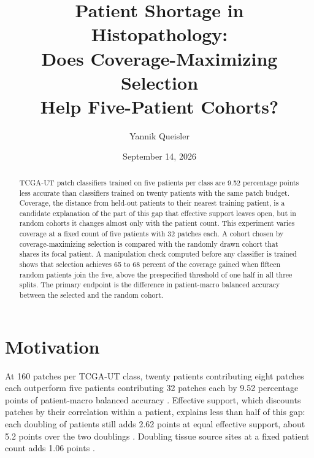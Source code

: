 \documentclass[11pt]{article}
\title{Patient Shortage in Histopathology:\\Does Coverage-Maximizing Selection\\Help Five-Patient Cohorts?}
\author{Yannik Queisler}
\date{September 14, 2026}
\begin{document}
\raggedbottom
{}
\setlength{\emergencystretch}{2em}
\maketitle
\begin{abstract}
\noindent TCGA-UT patch classifiers trained on five patients per class are 9.52 percentage points less accurate than classifiers trained on twenty patients with the same patch budget. Coverage, the distance from held-out patients to their nearest training patient, is a candidate explanation of the part of this gap that effective support leaves open, but in random cohorts it changes almost only with the patient count. This experiment varies coverage at a fixed count of five patients with 32 patches each. A cohort chosen by coverage-maximizing selection is compared with the randomly drawn cohort that shares its focal patient. A manipulation check computed before any classifier is trained shows that selection achieves 65 to 68 percent of the coverage gained when fifteen random patients join the five, above the prespecified threshold of one half in all three splits. The primary endpoint is the difference in patient-macro balanced accuracy between the selected and the random cohort.
\end{abstract}
\setcounter{tocdepth}{1}
\tableofcontents
\clearpage

\section{Motivation}
\label{sec:motivation}
At 160 patches per TCGA-UT class, twenty patients contributing eight patches each outperform five patients contributing 32 patches each by 9.52 percentage points of patient-macro balanced accuracy \citep{queisler2026effectiveSupport}. Effective support, which discounts patches by their correlation within a patient, explains less than half of this gap: each doubling of patients still adds 2.62 points at equal effective support, about 5.2 points over the two doublings \citep{queisler2026multidirectionalRedundancy}. Doubling tissue source sites at a fixed patient count adds 1.06 points \citep{queisler2026siteCoverage}.
\end{document}

